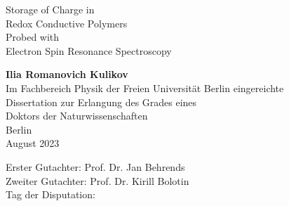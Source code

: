 \documentclass[12pt, twoside]{book}
\begin{document}
\thispagestyle{empty}
\begin{center}
\begin{huge}
Storage of Charge in\\
Redox Conductive Polymers\\
Probed with\\
Electron Spin Resonance Spectroscopy\\
\end{huge}
\vspace{7\baselineskip}
\textbf{Ilia Romanovich Kulikov}\\
\vspace{7\baselineskip}
Im Fachbereich Physik der Freien Universit\"{a}t Berlin eingereichte\\
Dissertation zur Erlangung des Grades eines\\
Doktors der Naturwissenschaften\\
\vspace{5\baselineskip}
Berlin\\
August 2023\\




\end{center}
\newpage
\vspace{36\baselineskip}

\hspace*{\fill} Erster Gutachter: Prof. Dr. Jan Behrends\\
\hspace*{\fill} Zweiter Gutachter: Prof. Dr. Kirill Bolotin\\
\hspace*{\fill} Tag der Disputation: \\

\newpage
\tableofcontents
\newpage

%





%
%
%





\end{document}
